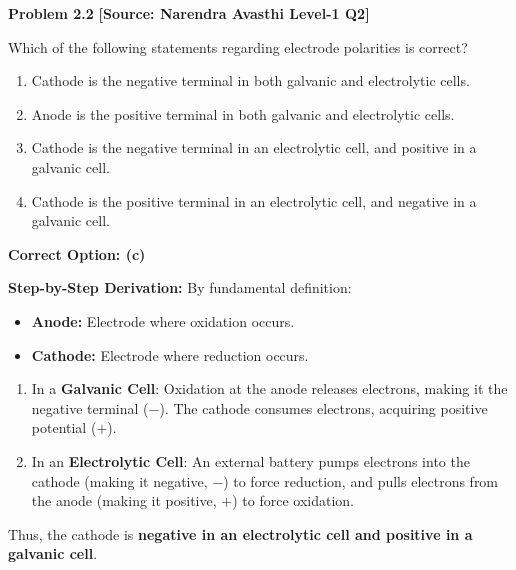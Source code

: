 \begin{problembox}
\textbf{Problem 2.2} \hfill \textbf{[Source: Narendra Avasthi Level-1 Q2]}

Which of the following statements regarding electrode polarities is correct?
\begin{enumerate}[label=(\alph*)]
    \item Cathode is the negative terminal in both galvanic and electrolytic cells.
    \item Anode is the positive terminal in both galvanic and electrolytic cells.
    \item Cathode is the negative terminal in an electrolytic cell, and positive in a galvanic cell.
    \item Cathode is the positive terminal in an electrolytic cell, and negative in a galvanic cell.
\end{enumerate}
\end{problembox}
\begin{solution}
\textbf{Correct Option: (c)}

\textbf{Step-by-Step Derivation:}
By fundamental definition:
\begin{itemize}
    \item \textbf{Anode:} Electrode where oxidation occurs.
    \item \textbf{Cathode:} Electrode where reduction occurs.
\end{itemize}
\begin{enumerate}[leftmargin=*]
    \item In a \textbf{Galvanic Cell}: Oxidation at the anode releases electrons, making it the negative terminal ($-$). The cathode consumes electrons, acquiring positive potential ($+$).
    \item In an \textbf{Electrolytic Cell}: An external battery pumps electrons into the cathode (making it negative, $-$) to force reduction, and pulls electrons from the anode (making it positive, $+$) to force oxidation.
\end{enumerate}
Thus, the cathode is \textbf{negative in an electrolytic cell and positive in a galvanic cell}.
\end{solution}

